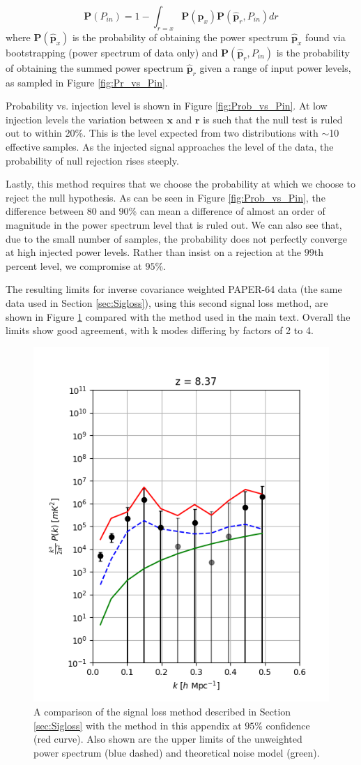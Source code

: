 \documentclass[preprint2,numberedappendix,tighten]{aastex6}  %
\newcommand{\dcj}[1]{{\color{orange} \textbf{[DCJ: #1]}}}
\newcommand{\Prob}{\mathbf{P}}
\begin{document}
 \begin{equation}
\Prob(P_{in})  =  1 -  \int_{r=x} \Prob(\hat{\textbf{p}}_x) \Prob(\hat{\textbf{p}}_r,P_{in}) dr
 \end{equation}
 where $\Prob(\hat{\textbf{p}}_x)$ is the probability of obtaining the power spectrum $\hat{\textbf{p}}_x$ found via bootstrapping (power spectrum of data only) and $\Prob(\hat{\textbf{p}}_r,P_{in})$ is the probability of obtaining the summed power spectrum $\hat{\textbf{p}}_{r}$ given a range of input power levels, as sampled in Figure \ref{fig:Pr_vs_Pin}.  
 
Probability vs. injection level is shown in Figure \ref{fig:Prob_vs_Pin}. At low injection levels the variation between $\textbf{x}$ and $\textbf{r}$ is such that the null test is ruled out to within $20$\%. This is the level expected from two distributions with $\sim$10 effective samples. 
As the injected signal approaches the level of the data, the probability of null rejection rises steeply.
  
Lastly, this method requires that we choose the probability at which we choose to reject the null hypothesis. As can be seen in Figure \ref{fig:Prob_vs_Pin}, the difference between $80$ and $90$\% can mean a difference of almost an order of magnitude in the power spectrum level that is ruled out. We can also see that, due to the small number of samples, the probability does not perfectly converge at high injected power levels. Rather than insist on a rejection at the $99$th percent level, we compromise at $95$\%.

The resulting limits for inverse covariance weighted PAPER-64 data (the same data used in Section \ref{sec:Sigloss}), using this second signal loss method, are shown in Figure \ref{fig:sigloss_compare} compared with the method used in the main text. Overall the limits show good agreement, with k modes differing by factors of 2 to 4.  

\begin{figure}[t]
\centering
\includegraphics[width=.4\textwidth]{plots/sigloss_method_comparison_95.png}
\caption{A comparison of the signal loss method described in Section \ref{sec:Sigloss}
with the method in this appendix at $95$\% confidence (red curve).
Also shown are the upper limits of the unweighted power spectrum
(blue dashed) and theoretical noise model (green).} 
\label{fig:sigloss_compare} 
\end{figure}



\end{document}
